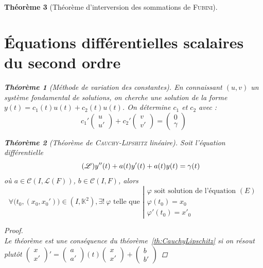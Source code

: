 \documentclass[11pt,a4paper]{report}
\newtheorem{theorem}{Théorème}[chapter]
\newtheorem{itheorem}[theorem]{Théorème}
\theoremstyle{definition}
\begin{document}
\begin{theorem}[Théorème d'interversion des sommations de \textsc{Fubini}]
{{\section{Équations différentielles scalaires du second ordre} %
\label{sec:equations_differentielles_scalaires_du_second_ordre}
\begin{itheorem}[Méthode de variation des constantes]
    En connaissant $(u,v)$ un système fondamental de solutions, on cherche une solution de la forme $y(t) = c_1(t) u(t) + c_2(t) u(t)$. On détermine $c_1$ et $c_2$ avec :
    \begin{equation}
    c_1'\begin{pmatrix} u \\ u' \end{pmatrix} + c_2'\begin{pmatrix} v \\ v' \end{pmatrix} = \begin{pmatrix} 0 \\ \gamma \end{pmatrix}
    \end{equation}
\end{itheorem}
\begin{itheorem}[Théorème de \textsc{Cauchy-Lipshitz} linéaire]
Soit l'équation différentielle 
\begin{equation}\tag{$\mathscr{L}$}
    y''(t) + a(t) y'(t) + a(t)y(t)= \gamma (t)
\end{equation}
où $a \in \mathcal{C}\left( I,\mathscr{L}(F)\right)$, $b\in \mathcal{C}(I,F)$, alors
\[
    \forall \big( t_0,(x_0,x_0') \big) \in (I,\mathbb{K}^2), \exists ! \: \varphi \text{ telle que }
    \left|
    \begin{array}{l}
        \varphi \text{ soit solution de l'équation }(E)\\
        \varphi(t_0)=x_0 \\
        \varphi'(t_0) = x'_0
    \end{array}
    \right.
\]
\end{itheorem}
\begin{proof} \hfill \\
    Le théorème est une conséquence du théorème~\ref{th:CauchyLipschitz} si on résout plutôt $\begin{pmatrix} x \\ x' \end{pmatrix}' = \begin{pmatrix} a \\ a' \end{pmatrix}(t)\begin{pmatrix} x \\ x' \end{pmatrix} + \begin{pmatrix} b \\ b' \end{pmatrix}$ 

\end{proof}}}
\end{theorem}
\end{document}
